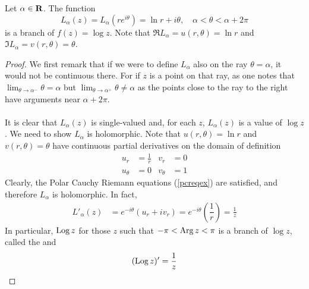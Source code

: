 \vspace*{1em}

\begin{proposition}\label{logbranch}
Let $\alpha \in \mathbf R$. The function
\[L_{\alpha}(z) = L_{\alpha}(re^{i\theta}) = \ln r + i\theta,\quad \alpha < \theta < \alpha + 2\pi\]
is a branch of $f(z) = \log z$. Note that $\Re L_\alpha = u(r,\theta) = \ln r$ and $\Im L_\alpha = v(r,\theta) = \theta$.
\end{proposition}
\begin{proof}
We first remark that if we were to define $L_\alpha$ also on the ray $\theta = \alpha$, it would not be continuous there. For if $z$ is a point on that ray, as one notes that $\lim_{\theta \to \alpha^-}\theta = \alpha$ but $\lim_{\theta \to \alpha^+}\theta \neq \alpha$ as the points close to the ray to the right have arguments near $\alpha + 2\pi$.\\
\\
It is clear that $L_\alpha(z)$ is single-valued and, for each $z$, $L_\alpha(z)$ is a value of $\log z$. We need to show $L_\alpha$ is holomorphic. Note that $u(r,\theta) = \ln r$ and $v(r,\theta) = \theta$ have continuous partial derivatives on the domain of definition
\begin{align*}
u_r &= \frac{1}{r} & v_r &= 0\\[0.5em]
u_\theta &= 0 & v_\theta &= 1
\end{align*}
Clearly, the Polar Cauchy Riemann equations (\ref{pcreqex}) are satisfied, and therefore $L_\alpha$ is holomorphic. In fact,
\begin{align*}
L'_\alpha(z) &= e^{-i\theta} (u_r + iv_r) = e^{-i\theta}\left(\dfrac{1}{r}\right) = \frac{1}{z}
\end{align*}
In particular, $\operatorname{Log} z$ for those $z$ such that $-\pi < \operatorname{Arg} z < \pi$ is a branch of $\log z$, called the   and 
\[(\operatorname{Log} z)' = \frac{1}{z}\]
\end{proof}

\vspace*{1em}

